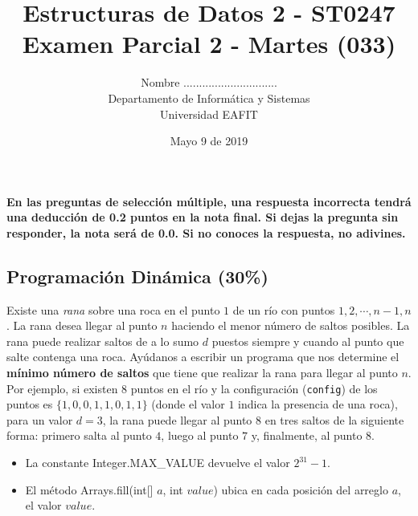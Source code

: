 \documentclass[9.5 pt]{article}
\title{\textbf {Estructuras de Datos 2 - ST0247\\Examen Parcial 2 - Martes (033)
}}
\author{Nombre ..............................\\
		Departamento de Informática y Sistemas\\
		Universidad EAFIT\\}
\date{Mayo 9 de 2019}
\begin{document}
\lstset{escapechar=@,style=customc, numbers=left, stepnumber = 1} 
\maketitle
\textbf{En las preguntas de selección múltiple, una respuesta incorrecta tendrá
una deducción de 0.2 puntos en la nota final. Si dejas la pregunta sin
responder, la nota será de 0.0. Si no conoces la respuesta, no adivines.}


\begin{multicols}{2}


	\section{Programación Dinámica (30\%)}
	Existe una \emph{rana} sobre una roca en el punto $1$ de un río con puntos $1, 2, \cdots, n - 1, n$. La rana desea llegar al punto $n$ haciendo el menor número de saltos posibles. La rana puede realizar saltos de a lo sumo $d$ puestos siempre y cuando al punto que salte contenga una roca.  Ayúdanos a escribir un programa que nos determine el \textbf{mínimo número de saltos} que tiene que realizar la rana para llegar al punto $n$.  \\
	Por ejemplo, si existen $8$ puntos en el río y la configuración (\texttt{config}) de los puntos es $\{1, 0, 0, 1, 1, 0, 1, 1\}$ (donde el valor $1$ indica la presencia de una roca), para un valor $d = 3$, la rana puede llegar al punto $8$ en tres saltos de la siguiente forma: primero salta al punto $4$, luego al punto $7$ y, finalmente, al punto $8$.
		\begin{itemize}[noitemsep]
		\item La constante Integer.MAX\_VALUE devuelve el valor $2^{31} - 1$.
		\item El método Arrays.fill(int[] $a$, int $value$) ubica en cada posición del arreglo $a$, el valor $value$.


\end{itemize}
\end{multicols}
\end{document}
